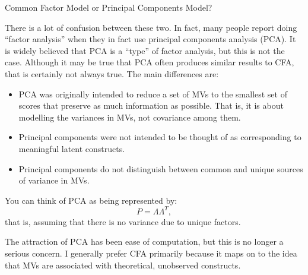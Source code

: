 \documentclass[10pt,ignorenonframetext,]{beamer}
\providecommand{\tightlist}{%
\setlength{\itemsep}{0pt}\setlength{\parskip}{0pt}}
\begin{document}
\begin{frame}{Common Factor Model or Principal Components Model?}

\small
There is a lot of confusion between these two. In fact, many people
report doing ``factor analysis'' when they in fact use principal
components analysis (PCA). It is widely believed that PCA is a ``type''
of factor analysis, but this is not the case. Although it may be true
that PCA often produces similar results to CFA, that is certainly not
always true. The main differences are:

\begin{itemize}
\tightlist
\item
  PCA was originally intended to reduce a set of MVs to the smallest set
  of scores that preserve as much information as possible. That is, it
  is about modelling the variances in MVs, not covariance among them.
\item
  Principal components were not intended to be thought of as
  corresponding to meaningful latent constructs.
\item
  Principal components do not distinguish between common and unique
  sources of variance in MVs.
\end{itemize}

You can think of PCA as being represented by: \[
P = \Lambda\Lambda^T, 
\] that is, assuming that there is no variance due to unique factors.

The attraction of PCA has been ease of computation, but this is no
longer a serious concern. I generally prefer CFA primarily because it
maps on to the idea that MVs are associated with theoretical, unobserved
constructs.

\end{frame}
\end{document}
